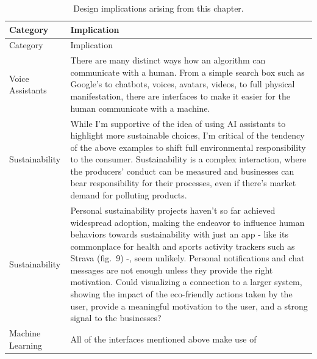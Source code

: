 \documentclass[
  letterpaper,
  DIV=11,
  numbers=noendperiod]{scrartcl}
\begin{document}
\begin{longtable}[]{@{}
  >{\raggedright\arraybackslash}p{}
  >{\raggedright\arraybackslash}p{}@{}}
\caption{Design implications arising from this chapter.}\tabularnewline
\toprule\noalign{}
\begin{minipage}[b]{\linewidth}\raggedright
Category
\end{minipage} & \begin{minipage}[b]{\linewidth}\raggedright
Implication
\end{minipage} \\
\midrule\noalign{}
\endfirsthead
\toprule\noalign{}
\begin{minipage}[b]{\linewidth}\raggedright
Category
\end{minipage} & \begin{minipage}[b]{\linewidth}\raggedright
Implication
\end{minipage} \\
\midrule\noalign{}
\endhead
\bottomrule\noalign{}
\endlastfoot
Voice Assistants & There are many distinct ways how an algorithm can
communicate with a human. From a simple search box such as Google's to
chatbots, voices, avatars, videos, to full physical manifestation, there
are interfaces to make it easier for the human communicate with a
machine. \\
Sustainability & While I'm supportive of the idea of using AI assistants
to highlight more sustainable choices, I'm critical of the tendency of
the above examples to shift full environmental responsibility to the
consumer. Sustainability is a complex interaction, where the producers'
conduct can be measured and businesses can bear responsibility for their
processes, even if there's market demand for polluting products. \\
Sustainability & Personal sustainability projects haven't so far
achieved widespread adoption, making the endeavor to influence human
behaviors towards sustainability with just an app - like its commonplace
for health and sports activity trackers such as Strava (fig.~9) -, seem
unlikely. Personal notifications and chat messages are not enough unless
they provide the right motivation. Could visualizing a connection to a
larger system, showing the impact of the eco-friendly actions taken by
the user, provide a meaningful motivation to the user, and a strong
signal to the businesses? \\
Machine Learning & All of the interfaces mentioned above make use of

\end{longtable}
\end{document}
